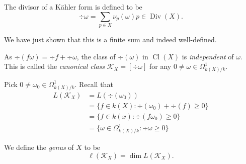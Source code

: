 \documentclass[a4paper]{article}
\DeclareMathOperator{\Cl}{Cl}
\DeclareMathOperator{\Div}{Div} %
\begin{document}
\begin{definition}
  The divisor of a Kähler form is defined to be
  \[
    \div \omega = \sum_{p \in X} \nu_p(\omega) p \in \Div(X).
  \]
\end{definition}
We have just shown that this is a finite sum and indeed well-defined.

As \(\div (f\omega) = \div f + \div \omega\), the class of \(\div(\omega)\) in \(\Cl(X)\) is \emph{independent} of \(\omega\). This is called the \emph{canonical class} \(\mathcal K_X = [\div \omega]\) for any \(0 \neq \omega \in \Omega^1_{k(X)/k}\).

Pick \(0 \neq \omega_0 \in \Omega^1_{k(X)/k}\). Recall that
\begin{align*}
  L(\mathcal K_X)
  &= L(\div(\omega_0)) \\
  &= \{f \in k(X): \div(\omega_0) + \div (f) \geq 0\} \\
  &= \{f \in k(x): \div (f \omega_0) \geq 0\} \\
  &= \{\omega \in \Omega^1_{k(X)/k}: \div \omega \geq 0\}
\end{align*}

\begin{definition}[genus]
  We define the \emph{genus} of \(X\) to be
  \[
    \ell(\mathcal K_X) = \dim L(\mathcal K_X).
  \]
\end{definition}
\end{document}
